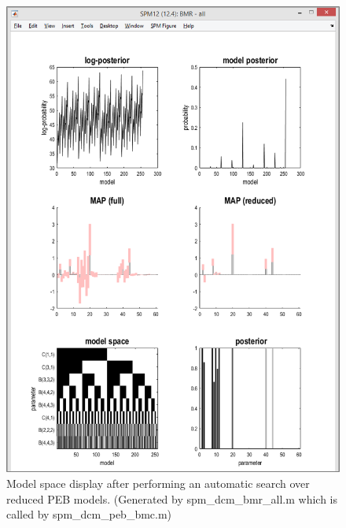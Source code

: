 \documentclass{article}
\begin{document}
\begin{figure}[ht]
\begin{center}
\includegraphics{"Fig_peb_search_part1"}
\caption{Model space display after performing an automatic search over reduced PEB models. (Generated by spm\_dcm\_bmr\_all.m which is called by spm\_dcm\_peb\_bmc.m) \label{Fig_peb_search_part1}}
\end{center}
\end{figure}
\end{document}
